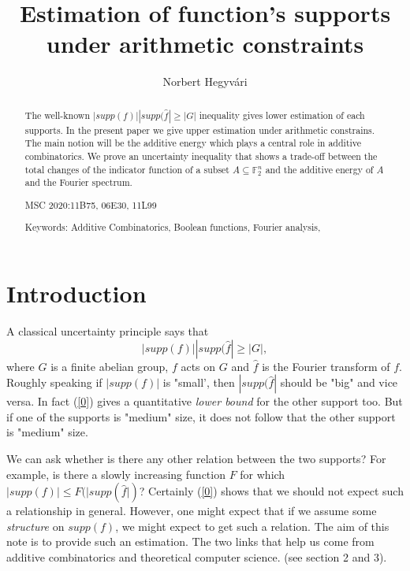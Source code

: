\documentclass[12pt]{amsart}%
\theoremstyle{definition}
\begin{document}
\title[Estimation of function's supports under arithmetic constraints]{Estimation of function's supports under arithmetic constraints}



\author[Norbert Hegyv\'ari]{Norbert Hegyv\'ari}
 \address{Norbert Hegyv\'{a}ri, ELTE TTK,
E\"otv\"os University, Institute of Mathematics, H-1117
P\'{a}zm\'{a}ny st. 1/c, Budapest, Hungary and Alfr\'ed R\'enyi Institute of Mathematics, Hungarian Academy of Science, H-1364 Budapest, P.O.Box 127.}


\begin{abstract}
The well-known $|supp(f)||supp(\widehat{f}|\geq |G|$ inequality gives lower estimation of each supports. In the present paper we give upper estimation under arithmetic constrains.
The main notion will be the additive energy which  plays a central role in additive combinatorics. We prove an uncertainty inequality that shows a trade-off between the total changes of the indicator function of a subset $A\subseteq \mathbb F^n_2$ and the additive energy of $A$ and the Fourier spectrum.

\bigskip

MSC 2020:11B75, 06E30, 11L99

Keywords:  Additive Combinatorics, Boolean functions, Fourier analysis, 
\end{abstract}


 \maketitle


\section{Introduction}



A classical uncertainty principle says that
\begin{equation}\label{0}
|supp(f)||supp(\widehat{f}|\geq |G|,
\end{equation}
where $G$ is a finite abelian group, $f$ acts on $G$ and $\widehat{f}$ is the Fourier transform of $f$. Roughly speaking if $|supp(f)|$ is "small', then $|supp(\widehat{f}|$ should be "big" and vice versa. In fact (\ref{0}) gives a quantitative {\it lower bound} for the other support too. But if one of the supports is "medium" size, it does not follow that the other support is "medium" size.

We can ask whether is there any other relation between the two supports? For example, is there a slowly increasing function $F$ for which $|supp(f)|\leq F(|supp(\widehat{f}|)$?  Certainly (\ref{0}) shows that we should not expect such a relationship in general. 
However, one might expect that if we assume some {\it structure} on $supp(f)$, we might expect to get such a relation. The aim of this note is to provide such an estimation. The two links that help us come from additive combinatorics and theoretical computer science.  (see section 2 and 3).
\end{document}
